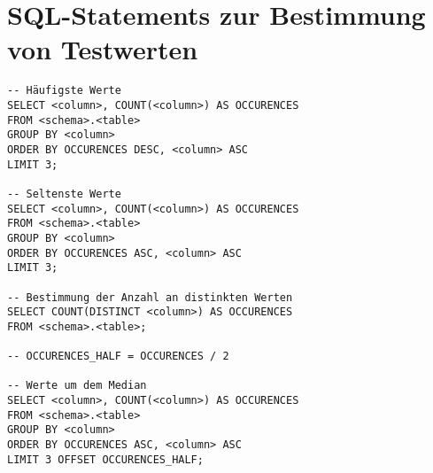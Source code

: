\clearpage
\section{SQL-Statements zur Bestimmung von Testwerten}

\begin{lstlisting}[caption={Bestimmung vorzuschlagender Testwerte anhand von Datencharakteristiken}, label={lst:distinctvalues}, language=mySQL]
-- Häufigste Werte
SELECT <column>, COUNT(<column>) AS OCCURENCES
FROM <schema>.<table>
GROUP BY <column>
ORDER BY OCCURENCES DESC, <column> ASC
LIMIT 3;

-- Seltenste Werte
SELECT <column>, COUNT(<column>) AS OCCURENCES
FROM <schema>.<table>
GROUP BY <column>
ORDER BY OCCURENCES ASC, <column> ASC
LIMIT 3;

-- Bestimmung der Anzahl an distinkten Werten
SELECT COUNT(DISTINCT <column>) AS OCCURENCES
FROM <schema>.<table>;

-- OCCURENCES_HALF = OCCURENCES / 2

-- Werte um dem Median
SELECT <column>, COUNT(<column>) AS OCCURENCES
FROM <schema>.<table>
GROUP BY <column>
ORDER BY OCCURENCES ASC, <column> ASC
LIMIT 3 OFFSET OCCURENCES_HALF;
\end{lstlisting}
